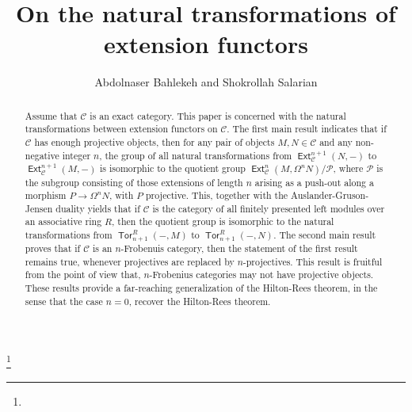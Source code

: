 \documentclass[11pt,a4paper]{amsart}
\newcommand{\rt}{\rightarrow}
\newcommand{\C}{\mathscr{C} }
\newcommand{\p}{\mathfrak{p} }
\def\Ext{\operatorname{{\mathsf{Ext}}}}
\def\Tor{\operatorname{\mathsf{Tor}}}
\def\syz{\mathsf{\Omega}}
\def\p{\mathcal P}
\theoremstyle{definition}
\theoremstyle{plain}
\theoremstyle{definition}
\numberwithin{equation}{section}
\begin{document}
\title[On the natural transformations of extension functors]
{On the natural transformations of extension functors}
\author[Bahlekeh and Salarian]{Abdolnaser Bahlekeh and Shokrollah Salarian}

\address{Department of Mathematics, Gonbad-Kavous University, Postal Code:4971799151, Gonbad-Kavous, Iran}


\address{Department of Pure Mathematics, Faculty of Mathematics and Statistics,
University of Isfahan, P.O.Box: 81746-73441, Isfahan,
 Iran and \\ School of Mathematics, Institute for Research in Fundamental Science (IPM), P.O.Box: 19395-5746, Tehran, Iran}


\thanks{}


\begin{abstract}
Assume that $\C$ is an exact category.
This paper is concerned with the natural transformations between extension functors on $\C$.  The first main result indicates that if $\C$ has enough projective objects, then for any pair of objects $M, N\in \C$ and any non-negative integer $n$, the group of all natural transformations from $\Ext^{n+1}_{\C}(N, -)$ to $\Ext^{n+1}_{\C}(M, -)$ is isomorphic to the quotient group $\Ext^n_{\C}(M, \syz^nN)/{\p}$, where $\p$ is the subgroup consisting of those extensions of length $n$ arising as a push-out along a morphism $P\rt\syz^nN$, with $P$ projective. This, together with the Auslander-Gruson-Jensen duality yields that if $\C$ is the category of all finitely presented left modules over an associative ring $R$, then the quotient group is isomorphic to the natural transformations from $\Tor_{n+1}^R(-, M)$ to $\Tor_{n+1}^R(-, N)$. The second main result proves  that if $\C$ is an $n$-Frobenuis category, then the statement of the first result remains true, whenever projectives are replaced by $n$-projectives. This result is fruitful from the point of view that, $n$-Frobenius categories may not have projective objects. These results provide a far-reaching generalization of the Hilton-Rees theorem, in the sense that the case $n=0$, recover the Hilton-Rees theorem.
\end{abstract}
\maketitle
\end{document}
